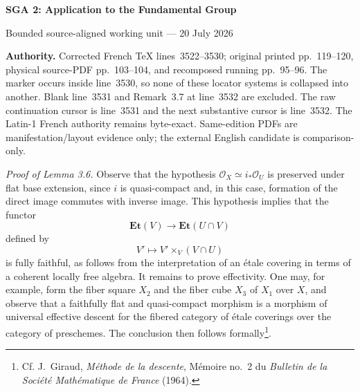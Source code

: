 \documentclass[10pt,a4paper]{article}
\newcommand{\Oo}{\mathcal O}
\newcommand{\Et}{\mathbf{Et}}
\begin{document}
\begin{center}
  {\Large\bfseries SGA 2: Application to the Fundamental Group}\par\smallskip
  {\large Bounded source-aligned working unit --- 20 July 2026}
\end{center}

\noindent\colorbox{softgray}{\parbox{0.95\linewidth}{\footnotesize\textbf{Authority.}
Corrected French TeX lines~3522--3530; original printed pp.~119--120,
physical source-PDF pp.~103--104, and recomposed running pp.~95--96. The
\texttt{\string\pageoriginale} marker occurs inside line~3530, so none of
these locator systems is collapsed into another. Blank line~3531 and
Remark~3.7 at line~3532 are excluded. The raw continuation cursor is
line~3531 and the next substantive cursor is line~3532. The Latin-1 French
authority remains byte-exact. Same-edition PDFs are manifestation/layout
evidence only; the external English candidate is comparison-only.}}

\medskip
\noindent\textit{Proof of Lemma 3.6.}\quad
Observe that the hypothesis
$\Oo_X\simeq i_*\Oo_U$ is preserved under flat base extension, since $i$ is
quasi-compact and, in this case, formation of the direct image commutes with
inverse image. This hypothesis implies that the functor
\[
  \Et(V)\longrightarrow\Et(U\cap V)
\]
defined by
\[
  V'\longmapsto V'\times_V(V\cap U)
\]
is fully faithful, as follows from the interpretation of an étale covering
in terms of a coherent locally free algebra. It remains to prove effectivity.
One may, for example, form the fiber square $X_2$ and the fiber cube $X_3$ of
$X_1$ over $X$, and observe that a faithfully flat and quasi-compact
morphism is a morphism of universal effective descent for the fibered
category of étale coverings over the category of preschemes. The conclusion
then follows formally\renewcommand{\thefootnote}{(*)}\footnote{Cf. J.~Giraud,
\emph{Méthode de la descente}, Mémoire no.~2 du \emph{Bulletin de la Société
Mathématique de France} (1964).}.
\end{document}
